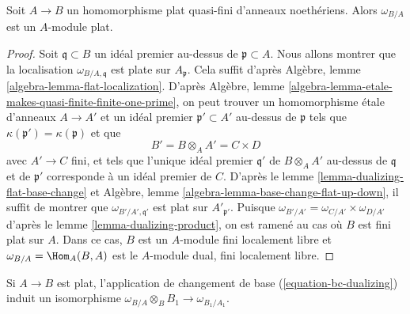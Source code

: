 \begin{lemma}
\label{lemma-dualizing-base-flat-flat}
Soit $A \to B$ un homomorphisme plat quasi-fini d'anneaux noethériens.
Alors $\omega_{B/A}$ est un $A$-module plat.
\end{lemma}

\begin{proof}
Soit $\mathfrak q \subset B$ un idéal premier au-dessus de $\mathfrak p \subset A$.
Nous allons montrer que la localisation $\omega_{B/A, \mathfrak q}$ est plate
sur $A_\mathfrak p$.
Cela suffit d'après Algèbre, lemme \ref{algebra-lemma-flat-localization}.
D'après
Algèbre, lemme \ref{algebra-lemma-etale-makes-quasi-finite-finite-one-prime},
on peut trouver un homomorphisme étale d'anneaux $A \to A'$ et un idéal
premier $\mathfrak p' \subset A'$ au-dessus de $\mathfrak p$
tels que $\kappa(\mathfrak p') = \kappa(\mathfrak p)$ et
que
$$
B' = B \otimes_A A' = C \times D
$$
avec $A' \to C$ fini, et tels que l'unique idéal premier $\mathfrak q'$
de $B \otimes_A A'$ au-dessus de $\mathfrak q$ et de $\mathfrak p'$
corresponde à un idéal premier de $C$. D'après le
lemme \ref{lemma-dualizing-flat-base-change}
et Algèbre, lemme \ref{algebra-lemma-base-change-flat-up-down},
il suffit de montrer que $\omega_{B'/A', \mathfrak q'}$
est plat sur $A'_{\mathfrak p'}$.
Puisque $\omega_{B'/A'} = \omega_{C/A'} \times \omega_{D/A'}$
d'après le lemme \ref{lemma-dualizing-product},
on est ramené au cas où $B$ est fini plat sur $A$.
Dans ce cas, $B$ est un $A$-module fini localement libre
et $\omega_{B/A} = \Hom_A(B, A)$ est le $A$-module dual,
fini localement libre.
\end{proof}

\begin{lemma}
\label{lemma-dualizing-base-change-of-flat}
Si $A \to B$ est plat, l'application de changement de base (\ref{equation-bc-dualizing})
induit un isomorphisme $\omega_{B/A} \otimes_B B_1 \to \omega_{B_1/A_1}$.
\end{lemma}

